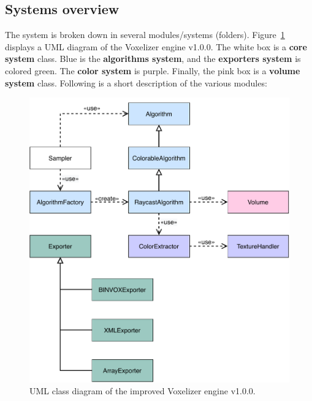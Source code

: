 \subsection{Systems overview}
\label{sec:method-implementation}
The system is broken down in several modules/systems (folders). Figure~\ref{fig:uml-voxelizer-v1} displays a UML diagram of the Voxelizer engine v1.0.0. The white box is a \textbf{core system} class. Blue is the \textbf{algorithms system}, and the \textbf{exporters system} is colored green. The \textbf{color system} is purple. Finally, the pink box is a \textbf{volume system} class. Following is a short description of the various modules:
\begin{figure}[ht]
    \centering
    \includegraphics[scale=0.75]{sections/methodology/figures/uml/uml-voxelizer.pdf}
    \caption{UML class diagram of the improved Voxelizer engine v1.0.0.}
    \label{fig:uml-voxelizer-v1}
\end{figure}
